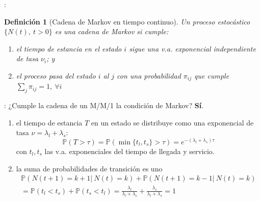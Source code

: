 \documentclass[xcolor={x11names}]{beamer}
\newtheorem{definicion}{Definición}[section]
\begin{document}


\begin{frame}{\secname: \subsecname}
    \begin{definicion}[Cadena de Markov en tiempo continuo\cite{amable}]
        Un proceso estocástico
        $\{N(t),\ t>0\}$ es una cadena de Markov
        si cumple:
        \begin{enumerate}
            \item el tiempo de estancia
                en el estado $i$ sigue
                una v.a. exponencial
                independiente de tasa $\nu_i$; y
            \item el proceso pasa del estado
                $i$ al $j$ con una
                probabilidad $\pi_{ij}$
                que cumple
                $\sum_j \pi_{ij} = 1,\ \forall i$
        \end{enumerate}
    \end{definicion}
\end{frame}




\begin{frame}{\secname: \subsecname}
    ¿Cumple la cadena de un M/M/1 la condición
    de Markov? \pause \textbf{Sí}.

    \vfill

    \begin{enumerate}
        \item el tiempo de estancia $T$ en un
            estado se distribuye como una
            exponencial de tasa
            $\nu=\lambda_l+\lambda_s$:
            \begin{equation*}
                \mathbb{P}(T>\tau)=\mathbb{P}(\min\{t_l,t_s\}>\tau)=e^{-(\lambda_l+\lambda_s)\tau}
            \end{equation*}
            con $t_l,t_s$ las v.a.
            exponenciales del tiempo de
            llegada y servicio.

        \item la suma de probabilidades
            de transición es uno
            \begin{multline*}
                \mathbb{P}(N(t+1)=k+1|\ N(t)=k)
                + \mathbb{P}(N(t+1)=k-1|\ N(t)=k)\\
                = \mathbb{P}(t_l<t_s)
                + \mathbb{P}(t_s<t_l)
                = \frac{\lambda_l}{\lambda_l+\lambda_s}
                + \frac{\lambda_s}{\lambda_l+\lambda_s} = 1
            \end{multline*}
    \end{enumerate}

\end{frame}
\end{document}
